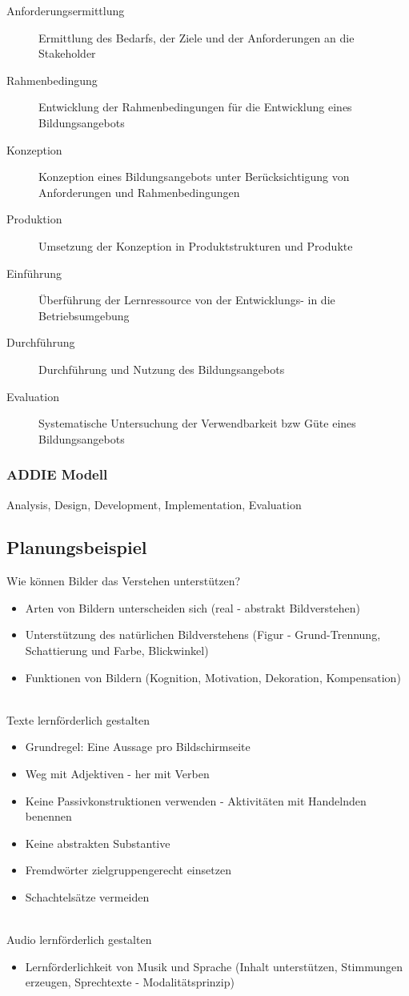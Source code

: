 \documentclass[a4paper]{article}
\begin{document}
\begin{description}
	\item[Anforderungsermittlung] Ermittlung des Bedarfs, der Ziele und der Anforderungen an die Stakeholder
	\item[Rahmenbedingung] Entwicklung der Rahmenbedingungen für die Entwicklung eines Bildungsangebots
	\item[Konzeption] Konzeption eines Bildungsangebots unter Berücksichtigung von Anforderungen und Rahmenbedingungen
	\item[Produktion] Umsetzung der Konzeption in Produktstrukturen und Produkte
	\item[Einführung] Überführung der Lernressource von der Entwicklungs- in die Betriebsumgebung
	\item[Durchführung] Durchführung und Nutzung des Bildungsangebots
	\item[Evaluation] Systematische Untersuchung der Verwendbarkeit bzw Güte eines Bildungsangebots
\end{description}

\subsubsection{ADDIE Modell}
Analysis, Design, Development, Implementation, Evaluation

\subsection{Planungsbeispiel}

Wie können Bilder das Verstehen unterstützen?
\begin{itemize}
	\item Arten von Bildern unterscheiden sich (real - abstrakt \textrightarrow Bildverstehen)
	\item Unterstützung des natürlichen Bildverstehens (Figur - Grund-Trennung, Schattierung und Farbe, Blickwinkel)
	\item Funktionen von Bildern (Kognition, Motivation, Dekoration, Kompensation)
\end{itemize}
~\\
Texte lernförderlich gestalten
\begin{itemize}
	\item Grundregel: Eine Aussage pro Bildschirmseite
	\item Weg mit Adjektiven - her mit Verben
	\item Keine Passivkonstruktionen verwenden - Aktivitäten mit Handelnden benennen
	\item Keine abstrakten Substantive
	\item Fremdwörter zielgruppengerecht einsetzen
	\item Schachtelsätze vermeiden
\end{itemize}
~\\
Audio lernförderlich gestalten
\begin{itemize}
	\item Lernförderlichkeit von Musik und Sprache (Inhalt unterstützen, Stimmungen erzeugen, Sprechtexte - Modalitätsprinzip)
\end{itemize}
\end{document}
